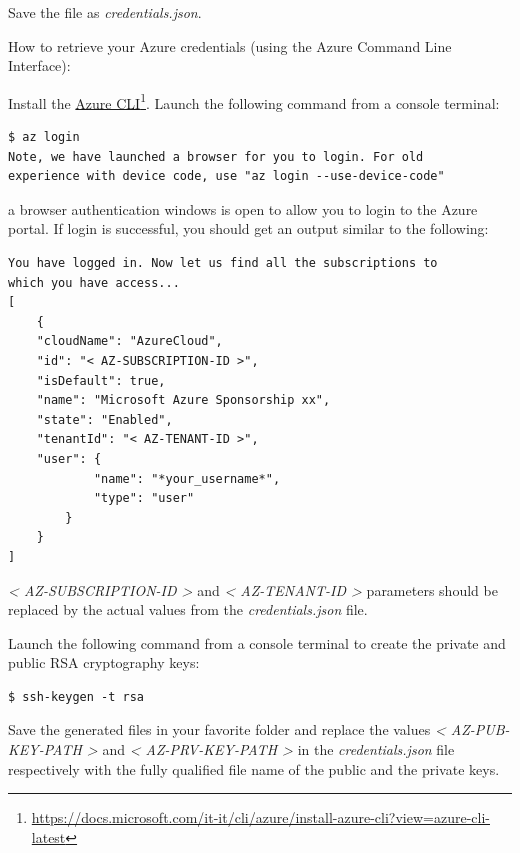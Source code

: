 Save the file as \emph{credentials.json}.

How to retrieve your Azure credentials (using the Azure Command Line
Interface):

Install the
\href{https://docs.microsoft.com/it-it/cli/azure/install-azure-cli?view=azure-cli-latest}{Azure CLI}\footnote{\url{https://docs.microsoft.com/it-it/cli/azure/install-azure-cli?view=azure-cli-latest}}. Launch the following command from a console terminal:

\begin{verbatim}
$ az login
Note, we have launched a browser for you to login. For old 
experience with device code, use "az login --use-device-code"
\end{verbatim}

a browser authentication windows is open to allow you to login to the
Azure portal. If login is successful, you should get an output similar
to the following:

\begin{verbatim}
You have logged in. Now let us find all the subscriptions to 
which you have access...
[
    {
    "cloudName": "AzureCloud",
    "id": "< AZ-SUBSCRIPTION-ID >",
    "isDefault": true,
    "name": "Microsoft Azure Sponsorship xx",
    "state": "Enabled",
    "tenantId": "< AZ-TENANT-ID >",
    "user": {
            "name": "*your_username*",
            "type": "user"
        }
    }
]
\end{verbatim}

\emph{\textless{} AZ-SUBSCRIPTION-ID 
\textgreater{}} and \emph{\textless{} AZ-TENANT-ID \textgreater{}}
parameters should be replaced by the actual values from the \emph{credentials.json} file.

Launch the following command from a console terminal to create the
private and public RSA cryptography keys:

\begin{verbatim}
$ ssh-keygen -t rsa
\end{verbatim}

Save the generated files in your favorite folder and replace the values
\emph{\textless{} AZ-PUB-KEY-PATH \textgreater{}} and \emph{\textless{}
AZ-PRV-KEY-PATH \textgreater{}} in the \emph{credentials.json} file
respectively with the fully qualified file name of the public and the
private keys.

